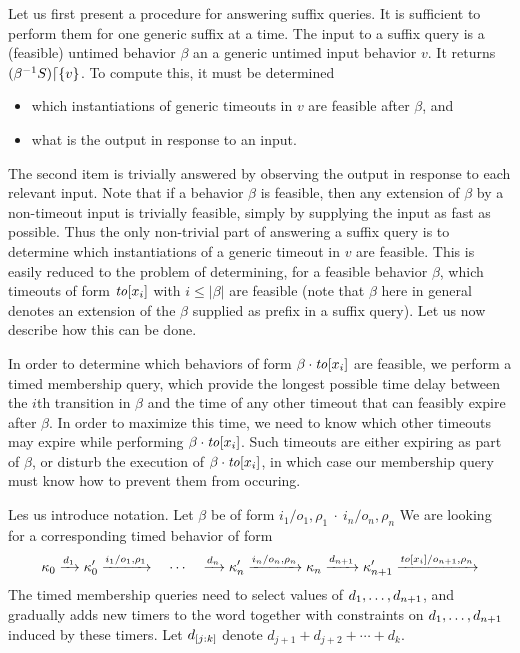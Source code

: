 Let us first present a procedure for answering suffix queries. It is
sufficient to perform them for one generic suffix at a time.
The input to a suffix query is a (feasible) untimed behavior $\beta$ an a
generic untimed input behavior $v$. It returns
$({\beta}^{-1}{S})\lceil{\lbrace v\rbrace}$. To compute this, it must be determined
\begin{itemize}
\item which instantiations of generic timeouts in $v$ are feasible after $\beta$, and
\item what is the output in response to an input.
\end{itemize}
The second item is trivially answered by observing the output in response to
each relevant input. Note that if a behavior $\beta$ is feasible, then
any extension of $\beta$ by a non-timeout input is trivially feasible, simply
by supplying the input as fast as possible. Thus the only non-trivial part
of answering a suffix query is to determine which instantiations of a generic
timeout in $v$ are feasible. This is easily reduced to the problem of
determining, for a feasible behavior $\beta$, which timeouts of form
$\mathit{to}[x_i]$ with $i \leq |\beta|$ are feasible (note that $\beta$ here in
general denotes an extension of the $\beta$ supplied as prefix in a
suffix query). Let us now describe how this can be done.

In order to determine which behaviors of form $\beta \cdot \mathit{to}[x_i]$
are feasible, we perform a timed membership query, which provide the longest
possible time delay between the $i$th transition in $\beta$ and the time
of any other timeout that can feasibly expire after $\beta$. In order to
maximize this time, we need to know which other timeouts may expire while
performing $\beta \cdot \mathit{to}[x_i]$. Such timeouts are either expiring
as part of $\beta$, or disturb the execution of $\beta \cdot \mathit{to}[x_i]$,
in which case our membership query must know how to prevent them from occuring.

Les us introduce notation. Let $\beta$ be of form
\(
  {i_1/o_1, \rho_1} \ \cdot \ {i_n/o_n, \rho_n}
\)
We are looking for a corresponding timed behavior of form 
\[
\kappa_0 \xrightarrow{d_1} \kappa'_0 \xrightarrow{i_1/o_1, \rho_1}
\quad \cdots \quad
\xrightarrow{d_n} \kappa'_n \xrightarrow{i_n/o_n, \rho_n} \kappa_n
\xrightarrow{d_{n+1}} \kappa'_{n+1} \xrightarrow{\mathit{to}[x_i]/o_{n+1}, \rho_n}
\]
The timed membership queries need to select values
of ${d}_1 , \ldots , {d}_{n+1}$, and gradually adds new timers to the word together
with constraints on ${d}_1 , \ldots , {d}_{n+1}$ induced by these timers.
Let $d_{[j:k]}$ denote $d_{j+1} + d_{j+2} + \cdots + d_k$.

